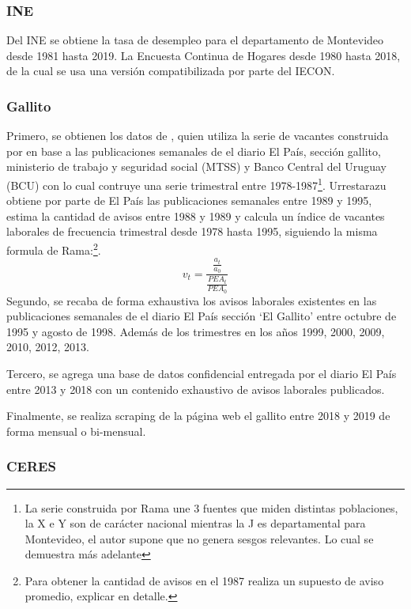 \documentclass[msc,oneside,a4paper]{udelar} %
\begin{document}
  \subsubsection*{INE}
  
  Del INE se obtiene la tasa de desempleo para el departamento de Montevideo desde 1981 hasta 2019.
  La Encuesta Continua de Hogares desde 1980 hasta 2018, de la cual se usa una versión compatibilizada por parte del IECON.
  
  \subsubsection*{Gallito}
  
  Primero, se obtienen los datos de \cite{Urrestarazu1997}, quien utiliza la serie de vacantes construida por \cite{Rama1988} en base a las publicaciones semanales de el diario El País, sección gallito, ministerio de trabajo y seguridad social (MTSS) y Banco Central del Uruguay (BCU) con lo cual contruye una serie trimestral entre 1978-1987\footnote{La serie construida por Rama une 3 fuentes que miden distintas poblaciones, la  X e Y son de carácter nacional mientras la J es departamental para Montevideo, el autor supone que no genera sesgos relevantes. Lo cual se demuestra más adelante}. Urrestarazu obtiene por parte de El País las publicaciones semanales entre 1989 y 1995, estima la cantidad de avisos entre 1988 y 1989 y calcula un índice de vacantes laborales de frecuencia trimestral desde 1978 hasta 1995, siguiendo la misma formula de Rama:\footnote{Para obtener la cantidad de avisos en el 1987 realiza un supuesto de aviso promedio, explicar en detalle.}.
  \begin{equation}
  v_t = \frac{\frac{a_t}{a_0}}{\frac{PEA_t}{PEA_0}}
  \end{equation}
  Segundo, se recaba de forma exhaustiva los avisos laborales existentes en las publicaciones semanales de el diario El País sección `El Gallito' entre octubre de 1995 y agosto de 1998. Además de los trimestres en los años 1999, 2000, 2009, 2010, 2012, 2013.
  
  Tercero, se agrega una base de datos confidencial entregada por el diario El País entre 2013 y 2018 con un contenido exhaustivo de avisos laborales publicados.
  
  Finalmente, se realiza scraping de la página web el gallito entre 2018 y 2019 de forma mensual o bi-mensual.
  
  \subsubsection*{CERES}
  
\end{document}

